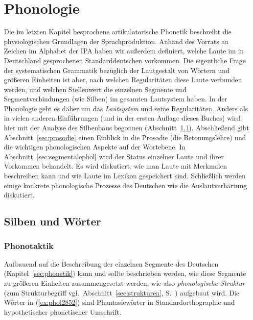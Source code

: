 \chapter{Phonologie}

\label{sec:phonologie}

Die im letzten Kapitel besprochene artikulatorische Phonetik beschreibt die physiologischen Grundlagen der Sprachproduktion.
Anhand des Vorrats an Zeichen im Alphabet der IPA haben wir außerdem definiert, welche Laute im in Deutschland gesprochenen Standarddeutschen vorkommen.
Die eigentliche Frage der systematischen Grammatik bezüglich der Lautgestalt von Wörtern und größeren Einheiten ist aber, nach welchen Regularitäten diese Laute verbunden werden, und welchen Stellenwert die einzelnen Segmente und Segmentverbindungen (wie \zB Silben) im gesamten Lautsystem haben.
In der Phonologie geht es daher um das \textit{Lautsystem} und seine Regularitäten.
Anders als in vielen anderen Einführungen (und in der ersten Auflage dieses Buches) wird hier mit der Analyse des Silbenbaus begonnen (Abschnitt~\ref{sec:phonotaktik}). 
Abschließend gibt Abschnitt~\ref{sec:prosodie} einen Einblick in die Prosodie (die Betonungslehre) und die wichtigen phonologischen Aspekte auf der Wortebene.
In Abschnitt~\ref{sec:segmentalephol} wird der Status einzelner Laute und ihrer Vorkommen behandelt.
Es wird diskutiert, wie man Laute mit Merkmalen beschreiben kann und wie Laute im Lexikon gespeichert sind.
Schließlich werden einige konkrete phonologische Prozesse des Deutschen wie die Auslautverhärtung diskutiert.





\section{Silben und Wörter}

\label{sec:phonotaktik}

\subsection{Phonotaktik}

Aufbauend auf die Beschreibung der einzelnen Segmente des Deutschen (Kapitel~\ref{sec:phonetik}) kann und sollte beschrieben werden, wie diese Segmente zu größeren Einheiten zusammengesetzt werden, wie also \textit{phonologische Struktur} (zum Strukturbegriff vgl.\ Abschnitt~\ref{sec:strukturen}, S.~\pageref{sec:strukturen}) aufgebaut wird.
Die Wörter in (\ref{ex:phol2852}) sind Phantasiewörter in Standardorthographie und hypothetischer phonetischer Umschrift.

